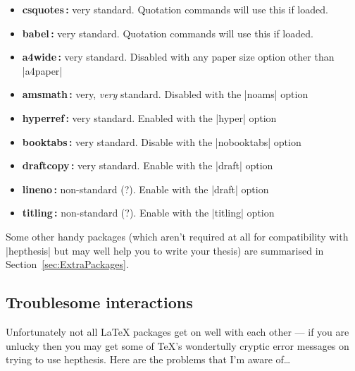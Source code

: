 \documentclass[12pt]{scrartcl}
\newcommand{\texpkg}[1]{#1}
\begin{document}
\begin{itemize}
\item \textbf{csquotes\,\cite{csquotes}:} very standard. Quotation commands will use this if loaded.
\item \textbf{babel\,\cite{babel}:} very standard. Quotation commands will use this if loaded.
\item \textbf{a4wide\,\cite{a4wide}:} very standard. Disabled with any paper size option other than |a4paper|
\item \textbf{amsmath\,\cite{amsmath}:} very, \emph{very} standard. Disabled with the |noams| option
\item \textbf{hyperref\,\cite{hyperref}:} very standard. Enabled with the |hyper| option
\item \textbf{booktabs\,\cite{booktabs}:} very standard. Disable with the |nobooktabs| option
\item \textbf{draftcopy\,\cite{draftcopy}:} very standard. Enable with the |draft| option
\item \textbf{lineno\,\cite{lineno}:} non-standard (?). Enable with the |draft| option
\item \textbf{titling\,\cite{titling}:} non-standard (?). Enable with the |titling| option
\end{itemize}

Some other handy packages (which aren't required at all for compatibility with
|hepthesis| but may well help you to write your thesis) are summarised in
Section~\ref{sec:ExtraPackages}.

\subsection{Troublesome interactions}
Unfortunately not all \LaTeX{} packages get on well with each other --- if
you are unlucky then you may get some of \TeX's wondertully cryptic error
messages on trying to use \texpkg{hepthesis}. Here are the problems that I'm
aware of\dots
\end{document}
